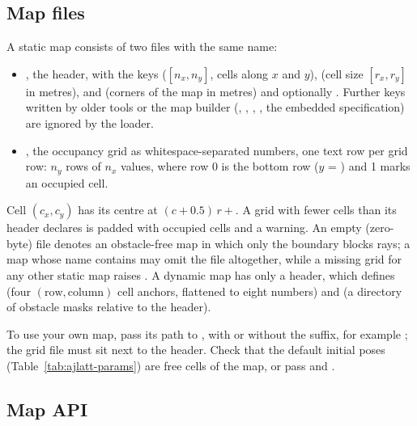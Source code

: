 \subsection{Map files}\label{sec:ajlatt-map-format}

A static map consists of two files with the same name:
\begin{itemize}
  \item {}, the header, with the keys 
        ($[n_x, n_y]$, cells along $x$ and $y$),  (cell size
        $[r_x, r_y]$ in metres),  and  (corners of the
        map in metres) and optionally . Further keys written by
        older tools or the map builder (, ,
        , , the embedded specification) are
        ignored by the loader.
  \item {}, the occupancy grid as whitespace-separated numbers,
        one text row per grid row: $n_y$ rows of $n_x$ values, where row 0 is
        the bottom row ($y$ = ) and 1 marks an occupied cell.
\end{itemize}
Cell $(c_x, c_y)$ has its centre at $(c + 0.5)\,r + $. A grid with
fewer cells than its header declares is padded with occupied cells and a
warning. An empty (zero-byte)  file denotes an obstacle-free map in
which only the boundary blocks rays; a map whose name contains  may
omit the file altogether, while a missing grid for any other static map raises
. A dynamic map has only a header, which defines
 (four $(\text{row}, \text{column})$ cell anchors, flattened
to eight numbers) and  (a directory of  obstacle
masks relative to the header).

To use your own map, pass its path to , with or without the
 suffix, for example ;
the grid file must sit next to the header. Check that the default initial poses
(Table~\ref{tab:ajlatt-params}) are free cells of the map, or pass
 and .

\subsection{Map API}\label{sec:ajlatt-map-api}

